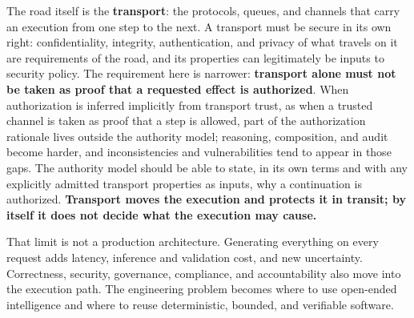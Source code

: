 \documentclass[10pt,oneside,openany]{book}
\begin{document}
{\begin{center}
{}
\end{center}

\begin{notebox}
The road itself is the \textbf{transport}: the protocols, queues, and channels that carry an execution from one step to the next. A transport must be secure in its own right: confidentiality, integrity, authentication, and privacy of what travels on it are requirements of the road, and its properties can legitimately be inputs to security policy. The requirement here is narrower: \textbf{transport alone must not be taken as proof that a requested effect is authorized}. When authorization is inferred implicitly from transport trust, as when a trusted channel is taken as proof that a step is allowed, part of the authorization rationale lives outside the authority model; reasoning, composition, and audit become harder, and inconsistencies and vulnerabilities tend to appear in those gaps. The authority model should be able to state, in its own terms and with any explicitly admitted transport properties as inputs, why a continuation is authorized. \textbf{Transport moves the execution and protects it in transit; by itself it does not decide what the execution may cause.}
\end{notebox}

That limit is not a production architecture. Generating everything on every request adds latency, inference and validation cost, and new uncertainty. Correctness, security, governance, compliance, and accountability also move into the execution path. The engineering problem becomes where to use open-ended intelligence and where to reuse deterministic, bounded, and verifiable software.

}
\end{document}
